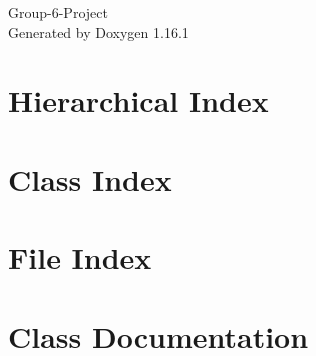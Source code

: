 \documentclass[twoside]{book}
\newcommand{\+}{\discretionary{\mbox{\scriptsize$\hookleftarrow$}}{}{}}
\newcommand{\clearemptydoublepage}{%
    \newpage{\pagestyle{empty}\cleardoublepage}%
  }
\begin{document}
  \raggedbottom
    \hypersetup{pageanchor=false,
                bookmarksnumbered=true,
                pdfencoding=unicode
               }
  \begin{titlepage}
  \vspace*{7cm}
  \begin{center}%
  {\Large Group-\/6-\/\+Project}\\
  \vspace*{1cm}
  {\large Generated by Doxygen 1.16.1}\\
  \end{center}
  \end{titlepage}
  \clearemptydoublepage
  \tableofcontents
  \clearemptydoublepage
  \hypersetup{pageanchor=true}
\chapter{Hierarchical Index}

\chapter{Class Index}

\chapter{File Index}

\chapter{Class Documentation}



















\end{document}
